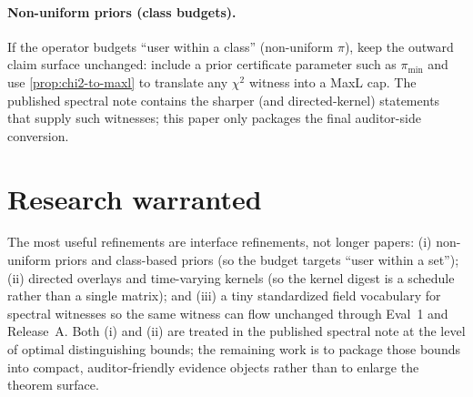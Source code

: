 \documentclass[11pt]{article}
\begin{document}
\paragraph{Non-uniform priors (class budgets).}
If the operator budgets ``user within a class'' (non-uniform $\pi$), keep the outward claim surface unchanged: include a prior certificate parameter such as $\pi_{\min}$ and use \cref{prop:chi2-to-maxl} to translate any $\chi^2$ witness into a MaxL cap.
The published spectral note contains the sharper (and directed-kernel) statements that supply such witnesses; this paper only packages the final auditor-side conversion.\cite{series:spectral}

\section{Research warranted}
The most useful refinements are interface refinements, not longer papers:
(i) non-uniform priors and class-based priors (so the budget targets ``user within a set'');
(ii) directed overlays and time-varying kernels (so the kernel digest is a schedule rather than a single matrix); and
(iii) a tiny standardized field vocabulary for spectral witnesses so the same witness can flow unchanged through Eval~1 and Release~A.
Both (i) and (ii) are treated in the published spectral note at the level of optimal distinguishing bounds;\cite{series:spectral}
the remaining work is to package those bounds into compact, auditor-friendly evidence objects rather than to enlarge the theorem surface.
\end{document}
